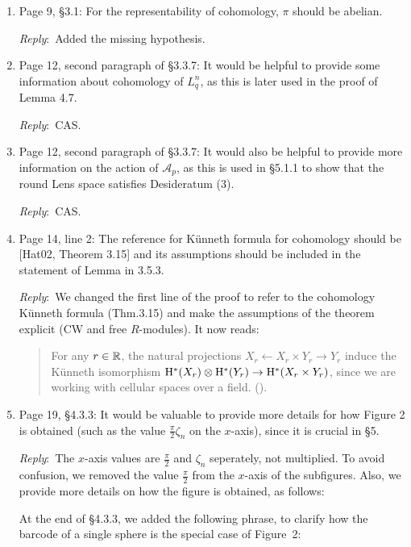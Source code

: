 \documentclass{amsart}
\newcommand{\ar}{\medskip\noindent\textit{Reply}:\ }
\begin{document}
\begin{enumerate}
		\ar Changed as suggested (CAS).

		\item Page 9, \S3.1: For the representability of cohomology, $\pi$ should be abelian.

		\ar Added the missing hypothesis.

		\item Page 12, second paragraph of \S3.3.7: It would be helpful to provide some information about cohomology of $L_q^n$, as this is later used in the proof of Lemma 4.7.

		\ar CAS.

		\item Page 12, second paragraph of \S3.3.7: It would also be helpful to provide more information on the action of $\mathcal{A}_p$, as this is used in \S5.1.1 to show that the round Lens space satisfies Desideratum (3).

		\ar CAS.

		\item Page 14, line 2: The reference for K\"unneth formula for cohomology should be [Hat02, Theorem 3.15] and its assumptions should be included in the statement of Lemma in 3.5.3.

		\ar We changed the first line of the proof to refer to the cohomology K\"unneth formula (Thm.3.15) and make the assumptions of the theorem explicit (CW and free \(R\)-modules).
		It now reads:

		\medskip
		\begin{quote}
			For any \(r \in \mathbb{R}\), the natural projections $X_r \leftarrow X_r \times Y_r \to Y_r$ induce the K\"unneth isomorphism $\mathrm{H}^*(X_r) \otimes \mathrm{H}^*(Y_r) \to \mathrm{H}^*(X_r \times Y_r)$, since we are working with cellular spaces over a field. (\cite[Thm.~3.15]{hatcher2000}).
		\end{quote}

		\item Page 19, \S4.3.3: It would be valuable to provide more details for how Figure 2 is obtained (such as the value $\frac{\pi}{2}\zeta_n$ on the $x$-axis), since it is crucial in \S5.

		\ar The $x$-axis values are $\frac{\pi}{2}$ and $\zeta_n$ seperately, not multiplied. To avoid confusion, we removed the value $\frac{\pi}{2}$ from the $x$-axis of the subfigures.
		Also, we provide more details on how the figure is obtained, as follows:

		\smallskip

		At the end of \S4.3.3, we added the following phrase, to clarify how the barcode of a single sphere
		is the special case of Figure~2:


\end{enumerate}
\end{document}
